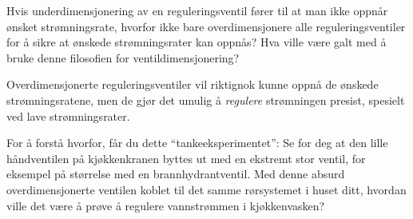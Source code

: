 

Hvis underdimensjonering av en reguleringsventil fører til at man ikke oppnår ønsket strømningsrate, hvorfor ikke bare overdimensjonere alle reguleringsventiler for å sikre at ønskede strømningsrater kan oppnås? Hva ville være galt med å bruke denne filosofien for ventildimensjonering?







Overdimensjonerte reguleringsventiler vil riktignok kunne oppnå de ønskede strømningsratene, men de gjør det umulig å {\it regulere} strømningen presist, spesielt ved lave strømningsrater.

\vskip 10pt

For å forstå hvorfor, får du dette ``tankeeksperimentet'': Se for deg at den lille håndventilen på kjøkkenkranen byttes ut med en ekstremt stor ventil, for eksempel på størrelse med en brannhydrantventil. Med denne absurd overdimensjonerte ventilen koblet til det samme rørsystemet i huset ditt, hvordan ville det være å prøve å regulere vannstrømmen i kjøkkenvasken?
 








